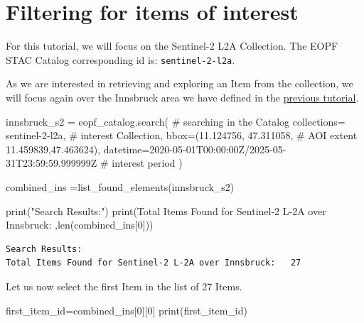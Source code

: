 \documentclass[
  letterpaper,
  DIV=11,
  numbers=noendperiod]{scrreprt}
\newenvironment{Shaded}{\begin{snugshade}}{\end{snugshade}}
\newcommand{\BuiltInTok}[1]{\textcolor[rgb]{0.00,0.23,0.31}{#1}}
\newcommand{\CommentTok}[1]{\textcolor[rgb]{0.37,0.37,0.37}{#1}}
\newcommand{\DecValTok}[1]{\textcolor[rgb]{0.68,0.00,0.00}{#1}}
\newcommand{\FloatTok}[1]{\textcolor[rgb]{0.68,0.00,0.00}{#1}}
\newcommand{\NormalTok}[1]{\textcolor[rgb]{0.00,0.23,0.31}{#1}}
\newcommand{\OperatorTok}[1]{\textcolor[rgb]{0.37,0.37,0.37}{#1}}
\newcommand{\StringTok}[1]{\textcolor[rgb]{0.13,0.47,0.30}{#1}}
\begin{document}
\section{Filtering for items of
interest}\label{filtering-for-items-of-interest}

For this tutorial, we will focus on the Sentinel-2 L2A Collection. The
EOPF STAC Catalog corresponding id is: \texttt{sentinel-2-l2a}.

As we are interested in retrieving and exploring an Item from the
collection, we will focus again over the Innsbruck area we have defined
in the \hyperref[access-the-eopf-zarr-stac-api-with-python]{previous
tutorial}.

\begin{Shaded}
\begin{Highlighting}[]
\NormalTok{innsbruck\_s2 }\OperatorTok{=}\NormalTok{ eopf\_catalog.search( }\CommentTok{\# searching in the Catalog}
\NormalTok{    collections}\OperatorTok{=} \StringTok{\textquotesingle{}sentinel{-}2{-}l2a\textquotesingle{}}\NormalTok{, }\CommentTok{\# interest Collection,}
\NormalTok{    bbox}\OperatorTok{=}\NormalTok{(}\FloatTok{11.124756}\NormalTok{, }\FloatTok{47.311058}\NormalTok{, }\CommentTok{\# AOI extent}
          \FloatTok{11.459839}\NormalTok{,}\FloatTok{47.463624}\NormalTok{),}
\NormalTok{    datetime}\OperatorTok{=}\StringTok{\textquotesingle{}2020{-}05{-}01T00:00:00Z/2025{-}05{-}31T23:59:59.999999Z\textquotesingle{}} \CommentTok{\# interest period}
\NormalTok{)}

\NormalTok{combined\_ins }\OperatorTok{=}\NormalTok{list\_found\_elements(innsbruck\_s2)}

\BuiltInTok{print}\NormalTok{(}\StringTok{"Search Results:"}\NormalTok{)}
\BuiltInTok{print}\NormalTok{(}\StringTok{\textquotesingle{}Total Items Found for Sentinel{-}2 L{-}2A over Innsbruck:  \textquotesingle{}}\NormalTok{,}\BuiltInTok{len}\NormalTok{(combined\_ins[}\DecValTok{0}\NormalTok{]))}
\end{Highlighting}
\end{Shaded}

\begin{verbatim}
Search Results:
Total Items Found for Sentinel-2 L-2A over Innsbruck:   27
\end{verbatim}

Let us now select the first Item in the list of 27 Items.

\begin{Shaded}
\begin{Highlighting}[]
\NormalTok{first\_item\_id}\OperatorTok{=}\NormalTok{combined\_ins[}\DecValTok{0}\NormalTok{][}\DecValTok{0}\NormalTok{]}
\BuiltInTok{print}\NormalTok{(first\_item\_id)}
\end{Highlighting}
\end{Shaded}
\end{document}
